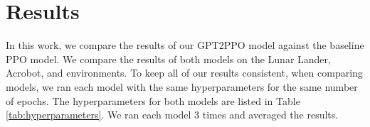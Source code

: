 


\section{Results}
\label{sec:results}

In this work, we compare the results of our GPT2PPO model against the baseline PPO model.
We compare the results of both models on the Lunar Lander, Acrobot, and environments.
To keep all of our results consistent, when comparing models, we ran each model with the
same hyperparameters for the same number of epochs.
The hyperparameters for both models are listed in Table \ref{tab:hyperparameters}.
We ran each model 3 times and averaged the results.


